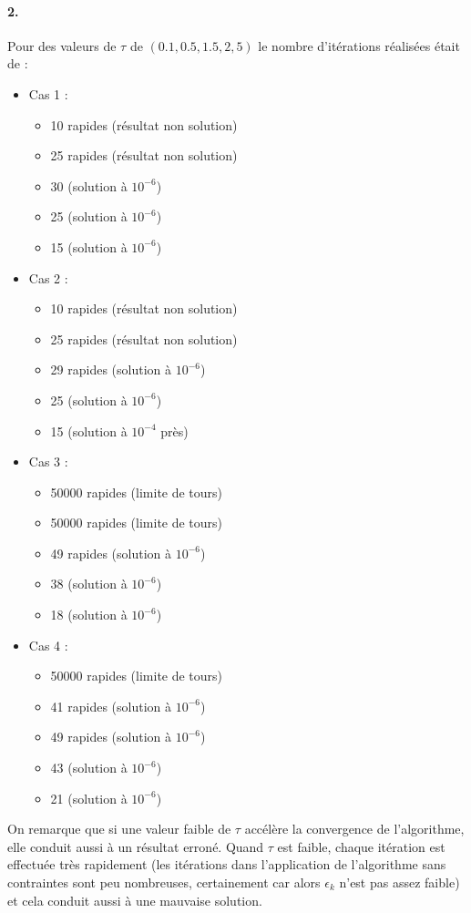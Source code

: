 \documentclass[12pt]{article}	%
\begin{document}
\paragraph{2.}
Pour des valeurs de $\tau$ de $(0.1, 0.5, 1.5, 2, 5)$ le nombre d'itérations réalisées était de :
\begin{itemize}
	\item Cas 1 :
		\begin{itemize}
			\item 10 rapides (résultat non solution)
			\item 25 rapides (résultat non solution)
			\item 30 (solution à $10^{-6}$)
			\item 25 (solution à $10^{-6}$)
			\item 15 (solution à $10^{-6}$)
		\end{itemize}
	\item Cas 2 :
		\begin{itemize}
			\item 10 rapides (résultat non solution)
			\item 25 rapides (résultat non solution)
			\item 29 rapides (solution à $10^{-6}$)
			\item 25 (solution à $10^{-6}$)
			\item 15 (solution à $10^{-4}$ près)
		\end{itemize}
	\item Cas 3 :
		\begin{itemize}
			\item 50000 rapides (limite de tours)
			\item 50000 rapides (limite de tours)
			\item 49 rapides (solution à $10^{-6}$)
			\item 38 (solution à $10^{-6}$)
			\item 18 (solution à $10^{-6}$)
		\end{itemize}
	\item Cas 4 :
		\begin{itemize}
			\item 50000 rapides (limite de tours)
			\item 41 rapides (solution à $10^{-6}$)
			\item 49 rapides (solution à $10^{-6}$)
			\item 43 (solution à $10^{-6}$)
			\item 21 (solution à $10^{-6}$)
		\end{itemize}
\end{itemize}
On remarque que si une valeur faible de $\tau$ accélère la convergence de l'algorithme, elle conduit aussi à un résultat erroné. Quand $\tau$ est faible, chaque itération est effectuée très rapidement (les itérations dans l'application de l'algorithme sans contraintes sont peu nombreuses, certainement car alors $\epsilon_k$ n'est pas assez faible) et cela conduit aussi à une mauvaise solution.
\end{document}
